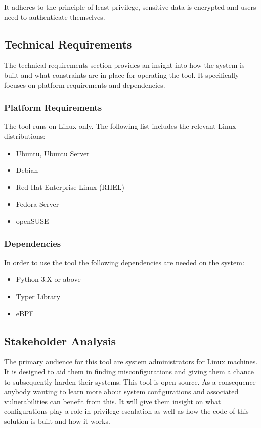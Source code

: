 It adheres to the principle of least privilege, sensitive data is encrypted and users need to authenticate themselves.

\subsection{Technical Requirements}

The technical requirements section provides an insight into how the system is built and what constraints are in place for operating the tool. It specifically focuses on platform requirements and dependencies.

\subsubsection{Platform Requirements}

The tool runs on Linux only. The following list includes the relevant Linux distributions:

\begin{itemize}
	\item Ubuntu, Ubuntu Server
	\item Debian
	\item Red Hat Enterprise Linux (RHEL)
	\item Fedora Server
	\item openSUSE
\end{itemize}

\subsubsection{Dependencies}

In order to use the tool the following dependencies are needed on the system:

\begin{itemize}
	\item Python 3.X or above
	\item Typer Library
	\item eBPF
\end{itemize}

\subsection{Stakeholder Analysis}

The primary audience for this tool are system administrators for Linux machines. It is designed to aid them in finding misconfigurations and giving them a chance to subsequently harden their systems. \newline\newline This tool is open source. As a consequence anybody wanting to learn more about system configurations and associated vulnerabilities can benefit from this. It will give them insight on what configurations play a role in privilege escalation as well as how the code of this solution is built and how it works.

